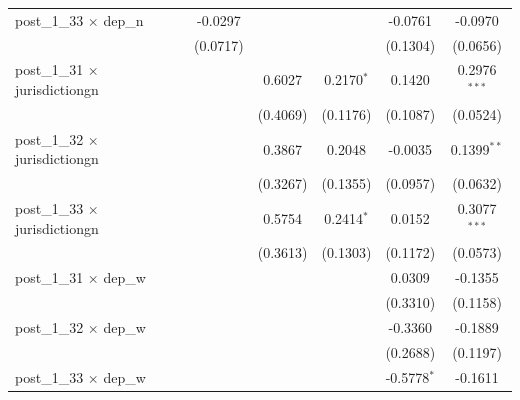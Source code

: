 \begin{tabular}{lcccccc}
   post\_1\_33 $\times$ dep\_n                              &              & -0.0297             &              &                     & -0.0761       & -0.0970\\   
                                                            &              & (0.0717)            &              &                     & (0.1304)      & (0.0656)\\   
   post\_1\_31 $\times$ jurisdictiongn                      &              &                     & 0.6027       & 0.2170$^{*}$        & 0.1420        & 0.2976$^{***}$\\   
                                                            &              &                     & (0.4069)     & (0.1176)            & (0.1087)      & (0.0524)\\   
   post\_1\_32 $\times$ jurisdictiongn                      &              &                     & 0.3867       & 0.2048              & -0.0035       & 0.1399$^{**}$\\   
                                                            &              &                     & (0.3267)     & (0.1355)            & (0.0957)      & (0.0632)\\   
   post\_1\_33 $\times$ jurisdictiongn                      &              &                     & 0.5754       & 0.2414$^{*}$        & 0.0152        & 0.3077$^{***}$\\   
                                                            &              &                     & (0.3613)     & (0.1303)            & (0.1172)      & (0.0573)\\   
   post\_1\_31 $\times$ dep\_w                              &              &                     &              &                     & 0.0309        & -0.1355\\   
                                                            &              &                     &              &                     & (0.3310)      & (0.1158)\\   
   post\_1\_32 $\times$ dep\_w                              &              &                     &              &                     & -0.3360       & -0.1889\\   
                                                            &              &                     &              &                     & (0.2688)      & (0.1197)\\   
   post\_1\_33 $\times$ dep\_w                              &              &                     &              &                     & -0.5778$^{*}$ & -0.1611\\   

\end{tabular}
